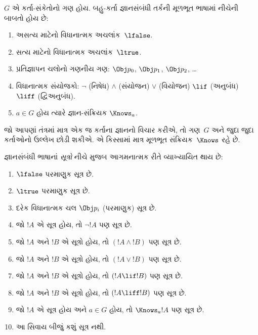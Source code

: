 \label{guunit:OLP-0484}


\begin{defn}
$G$ એ કર્તા-સંકેતોનો ગણ હોય. બહુ-કર્તા જ્ઞાનસંબંધી તર્કની
મૂળભૂત ભાષામાં નીચેની બાબતો હોય છે:
\begin{enumerate}
  \item અસત્ય માટેનો વિધાનાત્મક અચલાંક~$\lfalse$.
  \item સત્ય માટેનો વિધાનાત્મક અચલાંક~$\ltrue$.
  \item પ્રતિજ્ઞાપન ચલોનો ગણનીય ગણ: $\Obj
    p_0$, $\Obj p_1$, $\Obj p_2$, \dots
  \item વિધાનાત્મક સંયોજકો: \startycommalist
  \ycomma $\lnot$ (નિષેધ)%
  \ycomma $\land$ (સંયોજન)%
  \ycomma $\lor$ (વિયોજન)%
  \ycomma $\lif$ (અનુબંધ)%
  \ycomma $\liff$ (દ્વિઅનુબંધ).
  \item $a \in G$ હોય ત્યારે જ્ઞાન-સંક્રિયક $\Knows_a$.
\end{enumerate}
\end{defn}

જો આપણાં તંત્રમાં માત્ર એક જ કર્તાના જ્ઞાનનો વિચાર કરીએ, તો
ગણ~$G$ અને જુદા જુદા કર્તાઓનો ઉલ્લેખ છોડી શકીએ. એ કિસ્સામાં
માત્ર મૂળભૂત સંક્રિયક~$\Knows$ રહે છે.

\begin{defn}
જ્ઞાનસંબંધી ભાષાનાં \emph{સૂત્રો} નીચે મુજબ આગમનાત્મક રીતે
  વ્યાખ્યાયિત થાય છે:
\begin{enumerate}
\item $\lfalse$ પરમાણુક સૂત્ર છે.

\item $\ltrue$ પરમાણુક સૂત્ર છે.

\item દરેક વિધાનાત્મક ચલ $\Obj p_i$ (પરમાણુક) સૂત્ર છે.

\item જો $!A$ એ સૂત્ર હોય, તો $\lnot !A$ પણ
  સૂત્ર છે.

\item જો $!A$ અને $!B$ એ સૂત્રો હોય, તો $(!A \land
  !B)$ પણ સૂત્ર છે.

\item જો $!A$ અને $!B$ એ સૂત્રો હોય, તો $(!A \lor !B)$
  પણ સૂત્ર છે.

\item જો $!A$ અને $!B$ એ સૂત્રો હોય, તો $(!A \lif !B)$
  પણ સૂત્ર છે.

\item જો $!A$ અને $!B$ એ સૂત્રો હોય, તો $(!A \liff !B)$
  પણ સૂત્ર છે.

\item જો $!A$ એ સૂત્ર હોય અને $a \in G$ હોય, તો $\Knows_a !A$
  પણ સૂત્ર છે.

\item આ સિવાય બીજું કશું સૂત્ર નથી.
\end{enumerate}
\end{defn}

